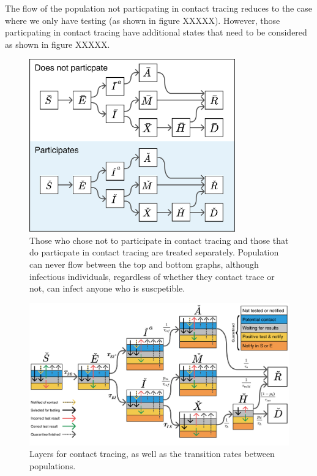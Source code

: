 \documentclass[notitlepage, superscriptaddress]{revtex4-2}
\begin{document}
The flow of the population not particpating in contact tracing reduces to the case where we only have testing (as shown in figure XXXXX). However, those particpating in contact tracing have additional states that need to be considered as shown in figure XXXXX.

\begin{figure}
\centering
\includegraphics[width=3.5in]{SEIR with contact tracing}
\caption{\label{f:SEIR-contactSeparation}
 Those who chose not to participate in contact tracing and those that do particpate in contact tracing are treated separately. Population can never flow between the top and bottom graphs, although infectious individuals, regardless of whether they contact trace or not, can infect anyone who is suscpetible.}
\end{figure}

\begin{figure}
\centering
\includegraphics[width=6.5in]{SEIR_testing_and__contact_transitions}
\caption{\label{f:SEIR-contact}
 Layers for contact tracing, as well as the transition rates between populations.}
\end{figure}
\end{document}

